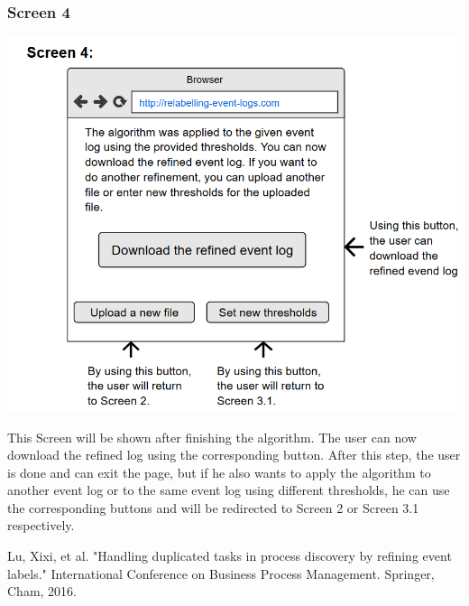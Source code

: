 \documentclass[notitlepage]{article}
\begin{document}
\begin{flushleft}
\subsubsection{Screen 4}
\includegraphics[scale=0.8]{InterfaceMockup4.png}

This Screen will be shown after finishing the algorithm. The user can now download the refined log using the corresponding button. After this step, the user is done and can exit the page, but if he also wants to apply the algorithm to another event log or to the same event log using different thresholds, he can use the corresponding buttons and will be redirected to Screen 2 or Screen 3.1 respectively.


%
%  




\end{flushleft}
%



\begin{thebibliography}{5}
Lu, Xixi, et al. "Handling duplicated tasks in process discovery by refining event labels." International Conference on Business Process Management. Springer, Cham, 2016.




\end{thebibliography}
\end{document}
